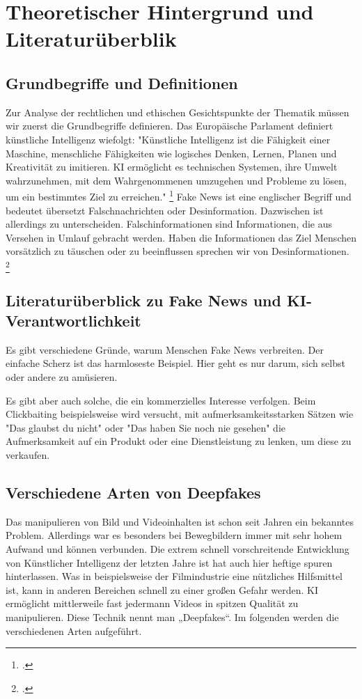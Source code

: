 \documentclass[Thesis.tex]{subfiles}
\begin{document}
\section{Theoretischer Hintergrund und Literaturüberblik}

\subsection{Grundbegriffe und Definitionen}
Zur Analyse der rechtlichen und ethischen Gesichtspunkte der Thematik müssen wir zuerst die Grundbegriffe definieren. 
Das Europäische Parlament definiert künstliche Intelligenz wiefolgt: "Künstliche Intelligenz ist die Fähigkeit einer Maschine,
menschliche Fähigkeiten wie logisches Denken, Lernen, Planen und Kreativität zu imitieren.
KI ermöglicht es technischen Systemen, ihre Umwelt wahrzunehmen, mit dem Wahrgenommenen umzugehen
und Probleme zu lösen, um ein bestimmtes Ziel zu erreichen." \footcite{Parlament2020}
Fake News ist eine englischer Begriff und bedeutet übersetzt Falschnachrichten oder Desinformation. Dazwischen ist allerdings zu unterscheiden.
Falschinformationen sind Informationen, die aus Versehen in Umlauf gebracht werden.
Haben die Informationen das Ziel Menschen vorsätzlich zu täuschen oder zu beeinflussen sprechen wir von Desinformationen. \footcite{Bundesregierung2023Desinformation}

\subsection{Literaturüberblick zu Fake News und KI-Verantwortlichkeit}
Es gibt verschiedene Gründe, warum Menschen Fake News verbreiten. 
Der einfache Scherz ist das harmloseste Beispiel. Hier geht es nur darum, sich selbst
oder andere zu amüsieren.

Es gibt aber auch solche, die ein kommerzielles Interesse verfolgen. 
Beim Clickbaiting beispielsweise wird versucht, mit aufmerksamkeitsstarken Sätzen
wie "Das glaubst du nicht" oder "Das haben Sie noch nie gesehen" die Aufmerksamkeit
  auf ein Produkt oder eine Dienstleistung zu lenken, um diese zu verkaufen.

\subsection{Verschiedene Arten von Deepfakes}
Das manipulieren von Bild und Videoinhalten ist schon seit Jahren ein bekanntes Problem. Allerdings war es besonders bei Bewegbildern 
immer mit sehr hohem Aufwand und können verbunden. Die extrem schnell vorschreitende Entwicklung von Künstlicher Intelligenz der letzten
Jahre ist hat auch hier heftige spuren hinterlassen. Was in beispielsweise der Filmindustrie eine nützliches Hilfsmittel ist,
kann in anderen Bereichen schnell zu einer großen Gefahr werden. KI ermöglicht mittlerweile fast jedermann Videos in spitzen Qualität 
zu manipulieren. Diese Technik nennt man „Deepfakes“. Im folgenden werden die verschiedenen Arten aufgeführt.
\end{document}
